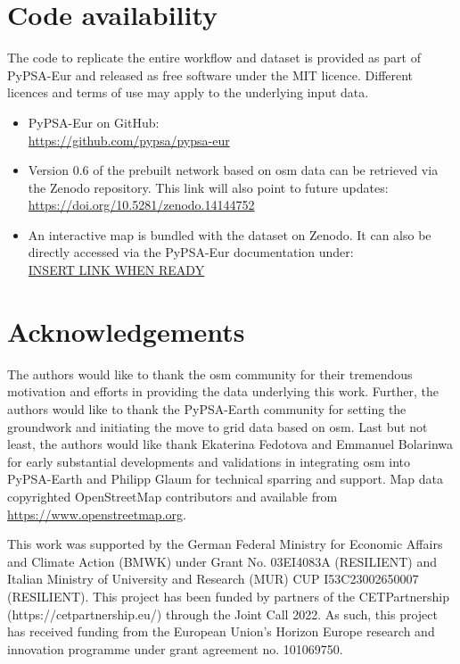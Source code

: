 \documentclass[fleqn,10pt]{wlscirep}
\let\autocite\cite
\begin{document}
\section*{Code availability}
The code to replicate the entire workflow and dataset is provided as part of PyPSA-Eur and released as free software under the MIT licence. Different licences and terms of use may apply to the underlying input data.
\begin{itemize}
    \item PyPSA-Eur \autocite{horschPyPSAEurOpenOptimisation2018} on GitHub: \\ \href{https://github.com/pypsa/pypsa-eur}{https://github.com/pypsa/pypsa-eur}
    \item Version 0.6 of the prebuilt network\autocite{xiongPrebuiltElectricityNetwork2024} based on \acrshort{osm} data can be retrieved via the Zenodo repository. This link will also point to future updates: \\ \href{https://doi.org/10.5281/zenodo.14144752}{https://doi.org/10.5281/zenodo.14144752}
    \item An interactive map is bundled with the dataset on Zenodo. It can also be directly accessed via the PyPSA-Eur documentation under: \\
    \href{https://google.com}{INSERT LINK WHEN READY}
\end{itemize}



\section*{Acknowledgements} %
The authors would like to thank the \gls{osm} community for their tremendous motivation and efforts in providing the data underlying this work. Further, the authors would like to thank the PyPSA-Earth community for setting the groundwork and initiating the move to grid data based on \gls{osm}. Last but not least, the authors would like thank Ekaterina Fedotova and Emmanuel Bolarinwa for early substantial developments and validations in integrating \acrshort{osm} into PyPSA-Earth and Philipp Glaum for technical sparring and support. Map data copyrighted OpenStreetMap contributors and available from \href{https://www.openstreetmap.org}{https://www.openstreetmap.org}. 

This work was supported by the German Federal Ministry for Economic Affairs and Climate Action (BMWK) under Grant No. 03EI4083A (RESILIENT) and Italian Ministry of University and Research (MUR) CUP I53C23002650007 (RESILIENT). This project has been funded by partners of the CETPartnership (https://cetpartnership.eu/) through the Joint Call 2022. As such, this project has received funding from the European Union's Horizon Europe research and innovation programme under grant agreement no. 101069750.
\end{document}
